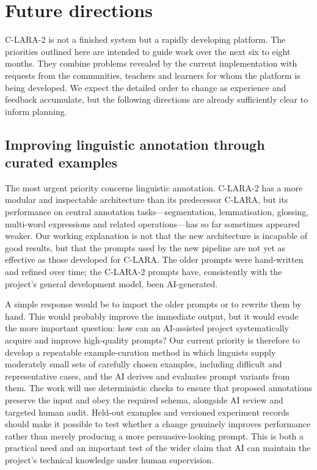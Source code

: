 \section{Future directions}

C-LARA-2 is not a finished system but a rapidly developing platform. The
priorities outlined here are intended to guide work over the next six to eight
months. They combine problems revealed by the current implementation with
requests from the communities, teachers and learners for whom the platform is
being developed. We expect the detailed order to change as experience and
feedback accumulate, but the following directions are already sufficiently
clear to inform planning.

\subsection{Improving linguistic annotation through curated examples}

The most urgent priority concerns linguistic annotation. C-LARA-2 has a more
modular and inspectable architecture than its predecessor C-LARA, but its
performance on central annotation tasks---segmentation, lemmatisation,
glossing, multi-word expressions and related operations---has so far sometimes
appeared weaker. Our working explanation is not that the new architecture is
incapable of good results, but that the prompts used by the new pipeline are
not yet as effective as those developed for C-LARA. The older prompts were
hand-written and refined over time; the C-LARA-2 prompts have, consistently
with the project's general development model, been AI-generated.

A simple response would be to import the older prompts or to rewrite them by
hand. This would probably improve the immediate output, but it would evade the
more important question: how can an AI-assisted project systematically acquire
and improve high-quality prompts? Our current priority is therefore to develop
a repeatable example-curation method in which linguists supply moderately small
sets of carefully chosen examples, including difficult and representative
cases, and the AI derives and evaluates prompt variants from them. The work
will use deterministic checks to ensure that proposed annotations preserve the
input and obey the required schema, alongside AI review and targeted human
audit. Held-out examples and versioned experiment records should make it
possible to test whether a change genuinely improves performance rather than
merely producing a more persuasive-looking prompt. This is both a practical
need and an important test of the wider claim that AI can maintain the
project's technical knowledge under human supervision.

